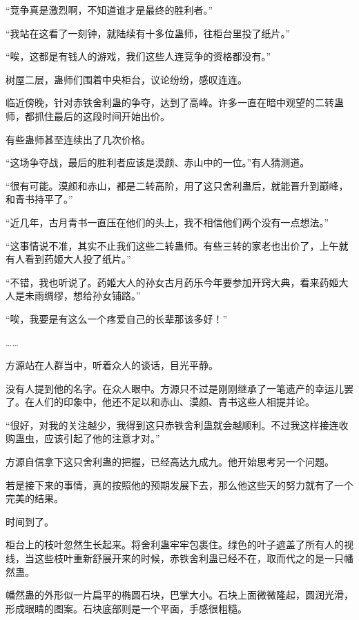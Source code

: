 
\begin{this_body}



“竞争真是激烈啊，不知道谁才是最终的胜利者。”

“我站在这看了一刻钟，就陆续有十多位蛊师，往柜台里投了纸片。”

“唉，这都是有钱人的游戏，我们这些人连竞争的资格都没有。”

树屋二层，蛊师们围着中央柜台，议论纷纷，感叹连连。

临近傍晚，针对赤铁舍利蛊的争夺，达到了高峰。许多一直在暗中观望的二转蛊师，都抓住最后的这段时间开始出价。

有些蛊师甚至连续出了几次价格。

“这场争夺战，最后的胜利者应该是漠颜、赤山中的一位。”有人猜测道。

“很有可能。漠颜和赤山，都是二转高阶，用了这只舍利蛊后，就能晋升到巅峰，和青书持平了。”

“近几年，古月青书一直压在他们的头上，我不相信他们两个没有一点想法。”

“这事情说不准，其实不止我们这些二转蛊师。有些三转的家老也出价了，上午就有人看到药姬大人投了纸片。”

“不错，我也听说了。药姬大人的孙女古月药乐今年要参加开窍大典，看来药姬大人是未雨绸缪，想给孙女铺路。”

“唉，我要是有这么一个疼爱自己的长辈那该多好！”

……

方源站在人群当中，听着众人的谈话，目光平静。

没有人提到他的名字。在众人眼中。方源只不过是刚刚继承了一笔遗产的幸运儿罢了。在人们的印象中，他还不足以和赤山、漠颜、青书这些人相提并论。

“很好，对我的关注越少，我得到这只赤铁舍利蛊就会越顺利。不过我这样接连收购蛊虫，应该引起了他的注意才对。”

方源自信拿下这只舍利蛊的把握，已经高达九成九。他开始思考另一个问题。

若是接下来的事情，真的按照他的预期发展下去，那么他这些天的努力就有了一个完美的结果。

时间到了。

柜台上的枝叶忽然生长起来。将舍利蛊牢牢包裹住。绿色的叶子遮盖了所有人的视线，当这些枝叶重新舒展开来的时候，赤铁舍利蛊已经不在，取而代之的是一只幡然蛊。

幡然蛊的外形似一片扁平的椭圆石块，巴掌大小。石块上面微微隆起，圆润光滑，形成眼睛的图案。石块底部则是一个平面，手感很粗糙。


\end{this_body}
